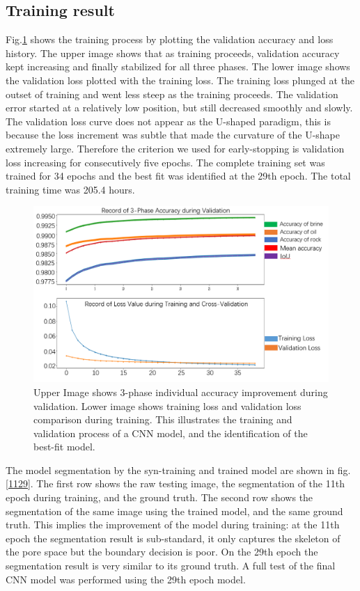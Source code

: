 \documentclass[draft,linenumbers]{agujournal2018}
\begin{document}
\subsection{Training result}
Fig.\ref{crossval} shows the training process by plotting the validation accuracy and loss history. The upper image shows that as training proceeds, validation accuracy kept increasing and finally stabilized for all three phases. The lower image shows the validation loss plotted with the training loss. The training loss plunged at the outset of training and went less steep as the training proceeds. The validation error started at a relatively low position, but still decreased smoothly and slowly. The validation loss curve does not appear as the U-shaped paradigm, this is because the loss increment was subtle that made the curvature of the U-shape extremely large. Therefore the criterion we used for early-stopping is validation loss increasing for consecutively five epochs. The complete training set was trained for 34 epochs and the best fit was identified at the 29th epoch. The total training time was 205.4 hours. 

\begin{figure}[h]
 \centering
 \includegraphics[width=33pc]{imgs/trainingresult_v1.png}
 \caption{Upper Image shows 3-phase individual accuracy improvement during validation. Lower image shows training loss and validation loss comparison during training. This illustrates the training and validation process of a CNN model, and the identification of the best-fit model.}
 \label{crossval}
 \end{figure}
 
 The model segmentation by the syn-training and trained model are shown in fig.\ref{1129}. The first row shows the raw testing image, the segmentation of the 11th epoch during training, and the ground truth. The second row shows the segmentation of the same image using the trained model, and the same ground truth. This implies the improvement of the model during training: at the 11th epoch the segmentation result is sub-standard, it only captures the skeleton of the pore space but the boundary decision is poor. On the 29th epoch the segmentation result is very similar to its ground truth. A full test of the final CNN model was performed using the 29th epoch model.
 
\end{document}
